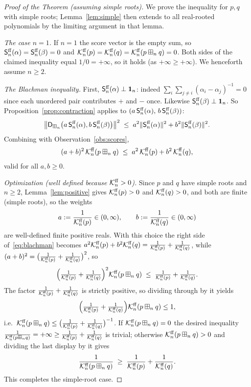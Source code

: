 \begin{proof}[Proof of the Theorem (assuming simple roots)]
We prove the inequality for $p,q$ with simple roots; Lemma~\ref{lem:simple} then
extends to all real-rooted polynomials by the limiting argument in that lemma.

\smallskip\noindent\textit{The case $n=1$.} If $n=1$ the score vector is the empty
sum, so $\mathsf{S}^{\mathrm{ff}}_n(\alpha)=\mathsf{S}^{\mathrm{ff}}_n(\beta)=0$ and
$\mathcal{K}^{\mathrm{ff}}_n(p)=\mathcal{K}^{\mathrm{ff}}_n(q)=\mathcal{K}^{\mathrm{ff}}_n(p\boxplus_n q)=0$. Both sides of the claimed
inequality equal $1/0=+\infty$, so it holds (as $+\infty\ge+\infty$). We henceforth
assume $n\ge2$.

\smallskip\noindent\textit{The Blachman inequality.}
First, $\mathsf{S}^{\mathrm{ff}}_n(\alpha)\perp\mathbf 1_n$: indeed
$\sum_i\sum_{j\ne i}(\alpha_i-\alpha_j)^{-1}=0$ since each unordered pair
contributes $+$ and $-$ once. Likewise $\mathsf{S}^{\mathrm{ff}}_n(\beta)\perp\mathbf 1_n$. So
Proposition~\ref{prop:contraction} applies to
$(a\,\mathsf{S}^{\mathrm{ff}}_n(\alpha),\,b\,\mathsf{S}^{\mathrm{ff}}_n(\beta))$:
\[
\bigl\|\mathsf{D}_{\boxplus_n}\bigl(a\,\mathsf{S}^{\mathrm{ff}}_n(\alpha),b\,\mathsf{S}^{\mathrm{ff}}_n(\beta)\bigr)\bigr\|^2
\;\le\;a^2\|\mathsf{S}^{\mathrm{ff}}_n(\alpha)\|^2+b^2\|\mathsf{S}^{\mathrm{ff}}_n(\beta)\|^2 .
\]
Combining with Observation~\ref{obs:scores},
\begin{equation}\label{eq:blachman}
(a+b)^2\,\mathcal{K}^{\mathrm{ff}}_n(p\boxplus_n q)\;\le\;a^2\,\mathcal{K}^{\mathrm{ff}}_n(p)+b^2\,\mathcal{K}^{\mathrm{ff}}_n(q),
\end{equation}
valid for all $a,b\ge0$.

\smallskip\noindent\textit{Optimization (well defined because $\mathcal{K}^{\mathrm{ff}}_n>0$).}
Since $p$ and $q$ have simple roots and $n\ge2$, Lemma~\ref{lem:positive} gives
$\mathcal{K}^{\mathrm{ff}}_n(p)>0$ and $\mathcal{K}^{\mathrm{ff}}_n(q)>0$, and both are finite (simple roots), so the
weights
\[
a:=\frac{1}{\mathcal{K}^{\mathrm{ff}}_n(p)}\in(0,\infty),\qquad b:=\frac{1}{\mathcal{K}^{\mathrm{ff}}_n(q)}\in(0,\infty)
\]
are well-defined finite positive reals. With this choice the right side
of~\eqref{eq:blachman} becomes
$a^2\mathcal{K}^{\mathrm{ff}}_n(p)+b^2\mathcal{K}^{\mathrm{ff}}_n(q)=\tfrac{1}{\mathcal{K}^{\mathrm{ff}}_n(p)}+\tfrac{1}{\mathcal{K}^{\mathrm{ff}}_n(q)}$,
while $(a+b)^2=\bigl(\tfrac{1}{\mathcal{K}^{\mathrm{ff}}_n(p)}+\tfrac{1}{\mathcal{K}^{\mathrm{ff}}_n(q)}\bigr)^2$, so
\[
\Bigl(\tfrac{1}{\mathcal{K}^{\mathrm{ff}}_n(p)}+\tfrac{1}{\mathcal{K}^{\mathrm{ff}}_n(q)}\Bigr)^2\mathcal{K}^{\mathrm{ff}}_n(p\boxplus_n q)
\;\le\;\tfrac{1}{\mathcal{K}^{\mathrm{ff}}_n(p)}+\tfrac{1}{\mathcal{K}^{\mathrm{ff}}_n(q)} .
\]
The factor $\tfrac{1}{\mathcal{K}^{\mathrm{ff}}_n(p)}+\tfrac{1}{\mathcal{K}^{\mathrm{ff}}_n(q)}$ is strictly positive,
so dividing through by it yields
\[
\Bigl(\tfrac{1}{\mathcal{K}^{\mathrm{ff}}_n(p)}+\tfrac{1}{\mathcal{K}^{\mathrm{ff}}_n(q)}\Bigr)\mathcal{K}^{\mathrm{ff}}_n(p\boxplus_n q)\le1,
\]
i.e.\ $\mathcal{K}^{\mathrm{ff}}_n(p\boxplus_n q)\le\bigl(\tfrac{1}{\mathcal{K}^{\mathrm{ff}}_n(p)}+\tfrac{1}{\mathcal{K}^{\mathrm{ff}}_n(q)}\bigr)^{-1}$.
If $\mathcal{K}^{\mathrm{ff}}_n(p\boxplus_n q)=0$ the desired inequality
$\tfrac{1}{\mathcal{K}^{\mathrm{ff}}_n(p\boxplus_n q)}=+\infty\ge\tfrac{1}{\mathcal{K}^{\mathrm{ff}}_n(p)}+\tfrac{1}{\mathcal{K}^{\mathrm{ff}}_n(q)}$
is trivial; otherwise $\mathcal{K}^{\mathrm{ff}}_n(p\boxplus_n q)>0$ and dividing the last display by it gives
\[
\frac{1}{\mathcal{K}^{\mathrm{ff}}_n(p\boxplus_n q)}\;\ge\;\frac{1}{\mathcal{K}^{\mathrm{ff}}_n(p)}+\frac{1}{\mathcal{K}^{\mathrm{ff}}_n(q)} .
\]
This completes the simple-root case.
\end{proof}


